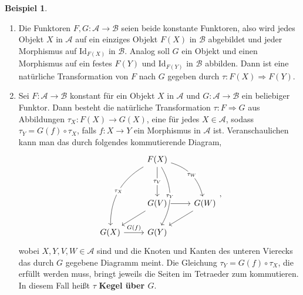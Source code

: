 \documentclass[leqno]{article}
\theoremstyle{plain}
\theoremstyle{definition}
\newtheorem{exmp}{Beispiel}[section]
\theoremstyle{remark}
\begin{document}
\begin{exmp}
\begin{enumerate}
	\item Die Funktoren $F,G: \mathcal{A} \rightarrow \mathcal{B}$ seien beide konstante Funktoren, also wird jedes Objekt $X$ in $\mathcal{A}$ auf ein einziges Objekt $F(X)$ in $\mathcal{B}$ abgebildet und jeder Morphismus auf $\text{Id}_{F(X)}$ in $\mathcal{B}$. Analog soll $G$ ein Objekt und einen Morphismus auf ein festes $F(Y)$ und $\text{Id}_{F(Y)}$ in $\mathcal{B}$ abbilden. Dann ist eine natürliche Transformation von $F$ nach $G$ gegeben durch $\tau: F(X) \Longrightarrow F(Y)$.
	\item Sei $F: \mathcal{A} \rightarrow \mathcal{B}$ konstant für ein Objekt $X$ in $\mathcal{A}$ und $G: \mathcal{A} \rightarrow \mathcal{B}$ ein beliebiger Funktor. Dann besteht die natürliche Transformation $\tau: F \Longrightarrow G$ aus Abbildungen $\tau_{X}: F(X) \rightarrow G(X)$, eine für jedes $X \in \mathcal{A}$, sodass $\tau_Y = G(f) \circ \tau_X$, falls $f:X \rightarrow Y$ ein Morphismus in $\mathcal{A}$ ist. Veranschaulichen kann man das durch folgendes kommutierende Diagram, 
	\begin{equation}
		\begin{tikzcd}
		               & F(X) \arrow[lddd, "\tau_X" description, bend right] \arrow[dd, "\tau_V" description] \arrow[rdd, "\tau_W" description, bend left] \arrow[ddd, "\tau_Y" description, bend left] &                 \\
		               &                                                                                                                                                                             &                 \\
		               & G(V) \arrow[r] \arrow[ld]                                                                                                                                                   & G(W) \arrow[ld] \\
		G(X) \arrow[r, "G(f)"] & G(Y)                                                                                                                                                                        &                
		\end{tikzcd},
	\end{equation}
	wobei $X,Y,V,W \in \mathcal{A}$ sind und die Knoten und Kanten des unteren Vierecks das durch $G$ gegebene Diagramm meint. Die Gleichung $\tau_Y = G(f) \circ \tau_X$, die erfüllt werden muss, bringt jeweils die Seiten im Tetraeder zum kommutieren. In diesem Fall heißt $\tau$ \textbf{Kegel über $G$}.

\end{enumerate}
\end{exmp}
\end{document}
